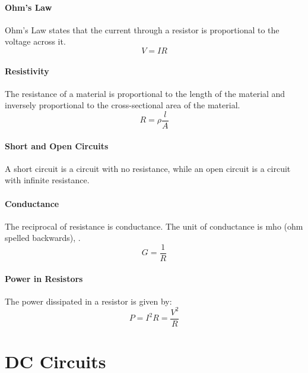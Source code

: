 \documentclass[11pt]{article}
\begin{document}
\paragraph{Ohm's Law} Ohm's Law states that the current through a resistor is proportional to the voltage across it.
\begin{equation}
    V = IR
\end{equation}
\paragraph{Resistivity} The resistance of a material is proportional to the length of the material and inversely proportional to the cross-sectional area of the material.
\begin{equation}
    R = \rho \frac{l}{A}
\end{equation}
\paragraph{Short and Open Circuits} A short circuit is a circuit with no resistance, while an open circuit is a circuit with infinite resistance.
\paragraph{Conductance} The reciprocal of resistance is conductance. The unit of conductance is mho (ohm spelled backwards), .
\begin{equation}
    G = \frac{1}{R}
\end{equation}
\paragraph{Power in Resistors} The power dissipated in a resistor is given by:
\begin{equation}
    P = I^2R = \frac{V^2}{R}
\end{equation}

\section{DC Circuits}
\paragraph{}
\end{document}

